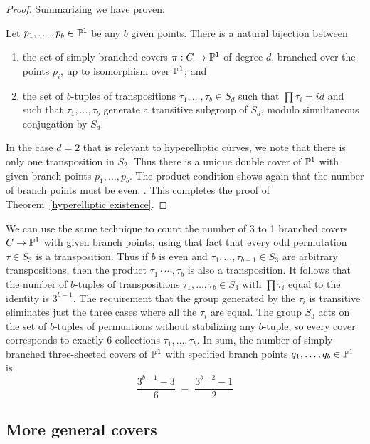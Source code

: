\begin{proof}
Summarizing we have proven:   
   \begin{lemma}\label{branched cover classification}
   Let $p_1,\dots, p_b \in \PP^1$ be any $b$ given points. There is a natural bijection between 
   \begin{enumerate}
   \item the set of  simply branched covers $\pi : C \to \PP^1$ of degree $d$, branched over the points $p_i$, up to isomorphism over $\PP^1$; and
   \item the set of $b$-tuples of transpositions $\tau_1, \dots, \tau_b \in S_d$ such that $\prod \tau_i = id$ and such that $\tau_1, \dots, \tau_b$ generate a transitive subgroup of $S_d$, modulo simultaneous conjugation by $S_d$.
   \end{enumerate}
   \end{lemma}

In the case $d=2$ that is relevant to hyperelliptic curves, we note that there is only one transposition in $S_2$. Thus there is a unique double cover of $\PP^1$ with given branch points $p_1,\dots,p_b$. The product
condition shows again that the number of branch points must be even. . This completes the proof of Theorem~\ref{hyperelliptic existence}.
\end{proof}

We can use the same technique to count the number of 3 to 1 branched covers  $C \to \PP^1$ with given branch points, using that fact that every odd permutation $\tau \in S_3$ is a transposition. Thus if $b$ is even and  $\tau_1,\dots,\tau_{b-1} \in S_3$ are arbitrary transpositions, then the product 
$\tau_1\cdot \cdots,\tau_{b}$ is also a
 transposition. It follows that the number of $b$-tuples of transpositions $\tau_1,\dots,\tau_{b} \in S_3$ with $\prod \tau_i$ equal to the identity is $3^{b-1}$. The requirement that the group generated by the $\tau_i$ is transitive eliminates just the three cases where all the $\tau_i$ are equal. The group $S_3$ acts on the set of $b$-tuples of permuations without stabilizing any $b$-tuple, so every cover corresponds to exactly 6 collections $\tau_1,\dots,\tau_b$. In sum, the number of simply branched three-sheeted covers of $\PP^1$ with specified branch points $q_1,\dots,q_b \in \PP^1$ is
$$
\frac{3^{b-1} - 3}{6} \; = \; \frac{3^{b-2} - 1}{2} 
$$


\subsection{More general covers}\label{general covers}

